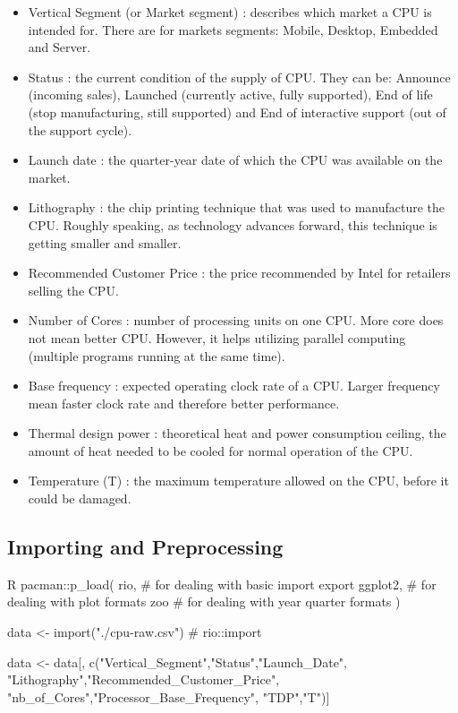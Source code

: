 \begin{itemize}
    \item Vertical Segment (or Market segment) : describes which market a CPU is intended for. There are for markets segments: Mobile, Desktop, Embedded and Server. 
    \item Status : the current condition of the supply of CPU. They can be: Announce (incoming sales), Launched (currently active, fully supported), End of life (stop manufacturing, still supported) and
    End of interactive support (out of the support cycle).
    \item Launch date : the quarter-year date of which the CPU was available on the market.
    \item Lithography : the chip printing technique that was used to manufacture the CPU. Roughly speaking, as technology advances forward, this technique is getting smaller and smaller.
    \item Recommended Customer Price : the price recommended by Intel for retailers selling the CPU.
    \item Number of Cores : number of processing units on one CPU. More core does not mean better CPU. However, it helps utilizing parallel computing (multiple programs running at the same time).
    \item Base frequency : expected operating clock rate of a CPU. Larger frequency mean faster clock rate and therefore better performance.
    \item Thermal design power : theoretical heat and power consumption ceiling, the amount of heat needed to be cooled for normal operation of the CPU.
    \item Temperature (T) : the maximum temperature allowed on the CPU, before it could be damaged.
\end{itemize}










\subsection{Importing and Preprocessing}

\begin{code}{R}
pacman::p_load(
    rio,     # for dealing with basic import export
    ggplot2, # for dealing with plot formats
    zoo      # for dealing with year quarter formats
)

data <- import("./cpu-raw.csv") # rio::import

data <- data[, c("Vertical_Segment","Status","Launch_Date",
                 "Lithography","Recommended_Customer_Price",
                 "nb_of_Cores","Processor_Base_Frequency",
                 "TDP","T")] 
\end{code}

